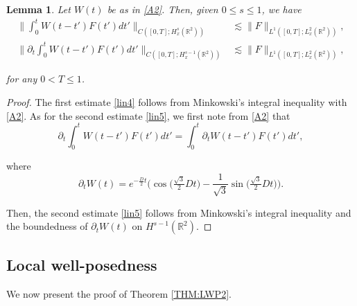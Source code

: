 \documentclass[letterpaper, 11pt,  reqno]{amsart}
\newtheorem{lemma}[theorem]{Lemma}
\newcommand{\1}{\hspace{0.5mm}\text{I}\hspace{0.2mm}}
\newcommand{\noi}{\noindent}
\newcommand{\R}{\mathbb{R}}
\newcommand{\dt}{\partial_t}
\newcommand{\les}{\lesssim}
\numberwithin{equation}{section}
\numberwithin{theorem}{section}
\begin{document}
\begin{lemma}\label{LEM:lin2}
Let $W(t)$ be as in \eqref{A2}.
Then, given $0 \leq  s \leq 1$, we  have 
\begin{align}
\bigg\|\int_0^t W(t - t')F(t') dt'\bigg\|_{C([0, T];   H^s_x(\R^2))}
& \les \|F\|_{L^1([0, T]; L^2_x(\R^2))}, 
\label{lin4}\\
\bigg\|\dt \int_0^t W(t - t')F(t') dt'\bigg\|_{C([0, T];   H^{s-1}_x(\R^2))}
& \les \|F\|_{L^1([0, T]; L^2_x(\R^2))},
\label{lin5}
\end{align}


\noi
for any $0 < T \leq 1$.

\end{lemma}

\begin{proof}
The first estimate \eqref{lin4} follows from Minkowski's integral inequality with \eqref{A2}.
As for the second estimate \eqref{lin5}, 
we first note from \eqref{A2} that 
\[ \dt \int_0^t W(t - t')F(t') dt'
= \int_0^t \dt W (t - t') F(t') dt', \]

\noi
where 
\[ \dt W(t) 
= e^{- \frac{D}{2}t} \bigg(\cos \big(\tfrac{\sqrt{3}}{2} Dt\big) 
- \frac{1}{\sqrt{3}}\sin \big(\tfrac{\sqrt{3}}{2} Dt\big) \bigg).\]

\noi
Then, the second estimate \eqref{lin5} follows from Minkowski's integral inequality
and the boundedness of $\dt W(t)$ on $H^{s-1}(\R^2)$.
\end{proof}







\subsection{Local well-posedness}
\label{SUBSEC:3.2}


We now present the proof of Theorem \ref{THM:LWP2}.
\end{document}
